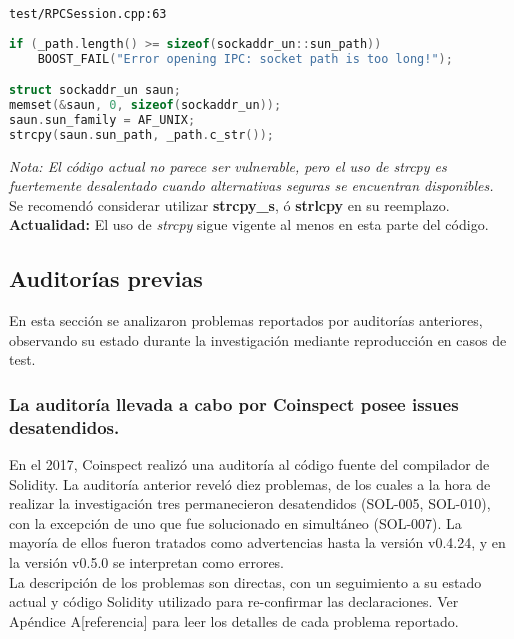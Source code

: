 \verb|test/RPCSession.cpp:63|

\begin{lstlisting}[language=c++]
if (_path.length() >= sizeof(sockaddr_un::sun_path))
    BOOST_FAIL("Error opening IPC: socket path is too long!");

struct sockaddr_un saun;
memset(&saun, 0, sizeof(sockaddr_un));
saun.sun_family = AF_UNIX;
strcpy(saun.sun_path, _path.c_str());
\end{lstlisting}

\textit{Nota: El código actual no parece ser vulnerable, pero el uso de strcpy es fuertemente desalentado cuando alternativas seguras se encuentran disponibles.}\\

Se recomendó considerar utilizar \textbf{strcpy\_s}, ó \textbf{strlcpy} en su reemplazo.\\

\textbf{Actualidad:} El uso de \textit{strcpy} sigue vigente al menos en esta parte del código.

\subsection{Auditorías previas}
En esta sección se analizaron problemas reportados por auditorías anteriores, observando su estado durante la investigación mediante reproducción en casos de test.

\subsubsection{La auditoría llevada a cabo por Coinspect posee issues desatendidos.}

En el 2017, Coinspect realizó una auditoría\cite{SolidityCompilerAuditReport} al código fuente del compilador de Solidity. La auditoría anterior reveló diez problemas, de los cuales a la hora de realizar la investigación tres permanecieron desatendidos (SOL-005, SOL-010), con la excepción de uno que fue solucionado en simultáneo (SOL-007). La mayoría de ellos fueron tratados como advertencias hasta la versión v0.4.24, y en la versión v0.5.0 se interpretan como errores.\\

La descripción de los problemas son directas, con un seguimiento a su estado actual y código Solidity utilizado para re-confirmar las declaraciones. Ver Apéndice A[referencia] para leer los detalles de cada problema reportado.\\


